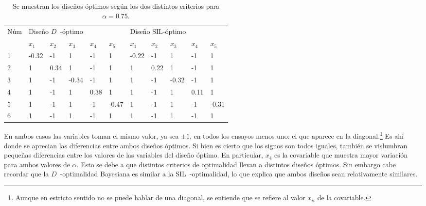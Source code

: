 \begin{table}[h]
\small
\centering
\begin{tabular}{l|lllll|lllll}
\multirow{2}{*}{Núm} & \multicolumn{5}{l|}{ \hspace{1.2cm} Diseño $D$~-óptimo} & \multicolumn{5}{l}{  \hspace{1cm}  Diseño SIL-óptimo}  \\
                     & $x_1$  & $x_2$ & $x_3$ & $x_4$ & $x_5$ & $x_1$ & $x_2$ & $x_3$ & $x_4$ & $x_5$  \\ \hline
1                    & -0.32  & -1    & 1     & -1    & 1     & -0.22  & -1    & 1     & -1    & 1      \\
2                    & 1      & 0.34  & 1     & -1    & 1     & 1     & 0.22  & 1     & -1    & 1      \\
3                    & 1      & -1    & -0.34  & -1    & 1     & 1     & -1    & -0.32 & -1    & 1      \\
4                    & 1      & -1    & 1     & 0.38  & 1     & 1     & -1    & 1     & 0.11  & 1      \\
5                    & 1      & -1    & 1     & -1    & -0.47 & 1     & -1    & 1     & -1    & -0.31 \\
6                    & 1      & -1    & 1     & -1    & 1     & 1     & -1    & 1     & -1    & 1     
\end{tabular}
\caption{Se muestran los diseños óptimos según los dos distintos criterios para $\alpha = 0.75$.}
\label{table:alfa75}
\end{table}


En ambos casos las variables toman el mismo valor, ya sea $\pm 1$, en todos los ensayos menos uno: el que aparece en la diagonal.\footnote{Aunque en estricto sentido no se puede hablar de una diagonal, se entiende que se refiere al valor $x_{ii}$ de la covariable.} Es ahí donde se aprecian las diferencias entre ambos diseños óptimos. Si bien es cierto que los signos son todos iguales, también se vislumbran pequeñas diferencias entre los valores de las variables del diseño óptimo. En particular, $x_4$ es la covariable que muestra mayor variación para ambos valores de $\alpha$. Esto se debe a que distintos criterios de optimalidad llevan a distintos diseños óptimos. Sin embargo cabe recordar que la $D$~-optimalidad Bayesiana es similar a la SIL~-optimalidad, lo que explica que ambos diseños sean relativamente similares. \\



